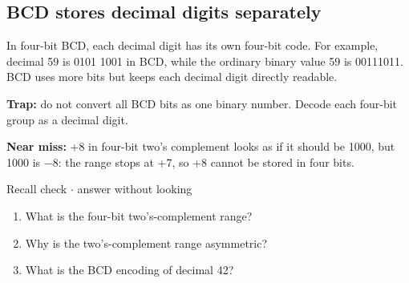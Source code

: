 \documentclass[11pt]{article}
\begin{document}
\begin{keepsection}
\begin{keepsection}
\subsection{BCD stores decimal digits separately}

In four-bit BCD, each decimal digit has its own four-bit code. For example, decimal 59 is 0101 1001 in BCD, while the ordinary binary value 59 is 00111011. BCD uses more bits but keeps each decimal digit directly readable.

\begin{notebox}\textbf{Trap:} do not convert all BCD bits as one binary number. Decode each four-bit group as a decimal digit.\end{notebox}

\begin{notebox}\textbf{Near miss:} +8 in four-bit two’s complement looks as if it should be 1000, but 1000 is \ensuremath{-}8: the range stops at +7, so +8 cannot be stored in four bits.\end{notebox}

\begin{recallbox}{Recall check \ensuremath{\cdot} answer without looking}
\begin{enumerate}
\item What is the four-bit two’s-complement range?
\item Why is the two’s-complement range asymmetric?
\item What is the BCD encoding of decimal 42?
\end{enumerate}

\end{recallbox}
\end{keepsection}
\end{keepsection}
\end{document}
